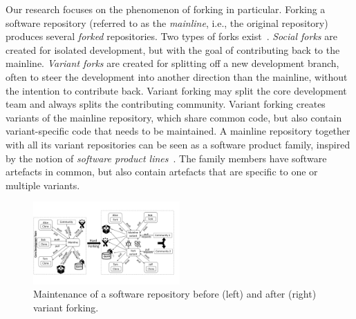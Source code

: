 Our research focuses on the phenomenon of forking in particular.
Forking a software repository (referred to as the \textit{mainline}, i.e., the original repository) produces several \textit{forked} repositories.
Two types of forks exist~\cite{Zhou:2020}. \textit{Social forks} are created for isolated development, but with the goal of contributing back to the mainline.
\textit{Variant forks} are created for splitting off a new development branch, often to steer the development into another direction than the mainline, without the intention to contribute back.
Variant forking may split the core development team and always splits the contributing community.
Variant forking creates variants of the mainline repository, which share common code, but also contain variant-specific code that needs to be maintained.
A mainline repository together with all its variant repositories can be seen as a software product family, inspired by the notion of \textit{software product lines}~\cite{berger.ea:2020:emse}.
The  family members have software artefacts in common, but also contain artefacts that are specific to one or multiple variants.

\begin{figure}[ht]
  \begin{center}
  \small
    \includegraphics[width=0.5\textwidth]{figures/Collaboration.pdf}
  \end{center}
  \caption{Maintenance of a software repository before (left) and after (right) variant forking.}
  \label{fig:forking}
\end{figure}

